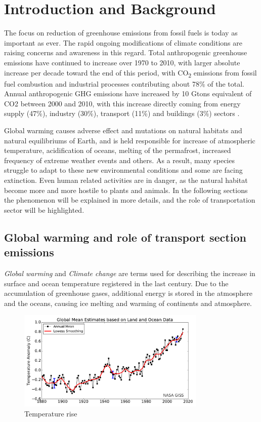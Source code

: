 \chapter{Introduction and Background}

The focus on reduction of greenhouse emissions from fossil fuels is today as important as ever. The rapid ongoing modifications of climate conditions are raising concerns and awareness in this regard. Total anthropogenic greenhouse emissions have continued to increase over 1970 to 2010, with larger absolute increase per decade toward the end of this period, with CO\textsubscript{2} emissions from fossil fuel combustion and industrial processes contributing about 78\% of the total. Annual anthropogenic GHG emissions have increased by 10 Gtons equivalent of CO2 between 2000 and 2010, with this increase directly coming from energy supply (47\%), industry (30\%), transport (11\%) and buildings (3\%) sectors \cite{IPCC2014}.

Global warming causes adverse effect and mutations on natural habitats and natural equilibriums of Earth, and is held responsible for increase of atmospheric temperature, acidification of oceans, melting of the permafrost, increased frequency of extreme weather events and others. As a result, many species struggle to adapt to these new environmental conditions and some are facing extinction. Even human related activities are in danger, as the natural habitat become more and more hostile to plants and animals. In the following sections the phenomenon will be explained in more details, and the role of transportation sector will be highlighted.

\section{Global warming and role of transport section emissions} \label{sec:global_warming}

\emph{Global warming} and \emph{Climate change} are terms used for describing the increase in surface and ocean temperature registered in the last century. Due to the accumulation of greenhouse gases, additional energy is stored in the atmosphere and the oceans, causing ice melting and warming of continents and atmosphere. 

\begin{figure}[h]
  \centering
  \includegraphics[width=0.8\textwidth]{figures/introduction/temp_rise.pdf}
  \caption{Temperature rise \cite{GISS2016}}
  \label{antropogenic_ghg_emissions}
\end{figure}

